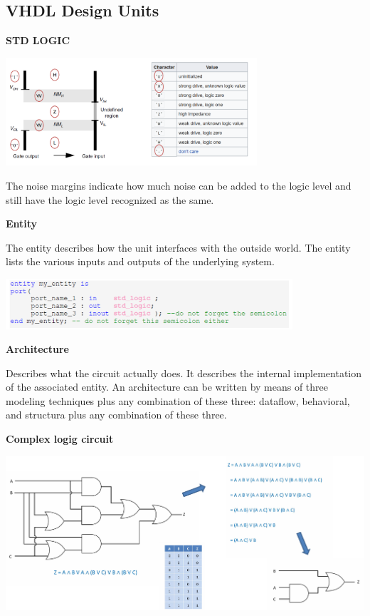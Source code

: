 \subsection{VHDL Design Units}


\textbf{STD LOGIC}

\begin{center}
	\includegraphics[width = 0.7\textwidth]{images/stdlogic.png}
\end{center}

The noise margins indicate how much noise can be added to the logic level
and still have the logic level recognized as the same.


\textbf{Entity}

The entity describes how the unit interfaces with the outside world.
The entity lists the various inputs and outputs of the underlying system.

\begin{center}
	\includegraphics[width=0.8\textwidth]{images/entity.png}
\end{center}

\textbf{Architecture}

Describes what the circuit actually does. It describes the internal
implementation of the associated entity. An architecture can be written by means of three modeling
techniques plus any combination of these three: dataflow, behavioral, and structura plus any combination of these three.


\textbf{Complex logig circuit}

\begin{center}
	\includegraphics[width=\textwidth]{images/complexLogic.png}
\end{center}


